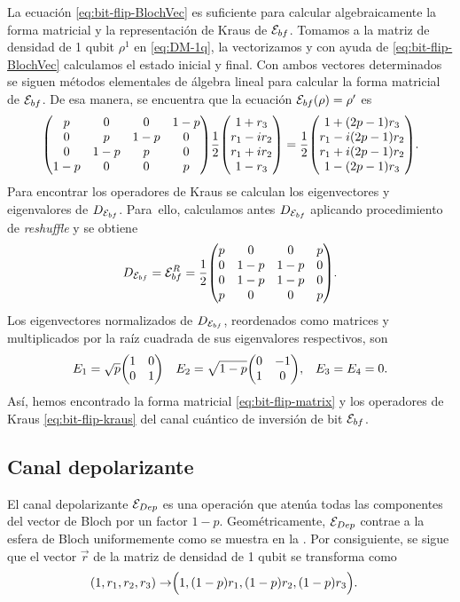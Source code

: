La ecuación \eqref{eq:bit-flip-BlochVec} es suficiente para 
calcular algebraicamente la forma matricial y 
la representación de Kraus de $\mathcal{E}_{bf}$.
Tomamos a la matriz de densidad de 1 qubit $\rho^1$ en 
\eqref{eq:DM-1q}, la vectorizamos y con ayuda de 
\eqref{eq:bit-flip-BlochVec} calculamos el estado inicial y 
final. Con ambos vectores determinados se siguen métodos elementales 
de álgebra lineal para calcular la forma matricial de $\mathcal{E}_{bf}$.
De esa manera, se encuentra que la ecuación 
$\mathcal{E}_{bf}(\rho)=\rho'$ es
\begin{align}
\mqty(
 p & 0 & 0 & 1-p \\
 0 & p & 1-p & 0 \\
 0 & 1-p & p & 0 \\
 1-p & 0 & 0 & p 
)
\frac{1}{2}
\mqty(
1+r_3\\r_1-ir_2\\r_1+ir_2\\1-r_3
)
=
\frac{1}{2}
\mqty(
1+\qty(2p-1)r_3\\
r_1-i\qty(2p-1)r_2\\
r_1+i\qty(2p-1)r_2\\
1-\qty(2p-1)r_3
).
\label{eq:bit-flip-matrix}
\end{align}
Para encontrar los operadores de Kraus se calculan los eigenvectores
y eigenvalores de $D_{\mathcal{E}_{bf}}$. Para~ello, calculamos antes
$D_{\mathcal{E}_{bf}}$ aplicando procedimiento de \textit{reshuffle} y se obtiene
\begin{align}
  D_{\E_{bf}}=\E_{bf}^R=
  \frac{1}{2}\mqty(
 p & 0 & 0 & p \\
 0 & 1-p & 1-p & 0 \\
 0 & 1-p & 1-p & 0 \\
 p & 0 & 0 & p 
  ).
  \label{eq:Choi-E_bpf}
\end{align}
Los eigenvectores normalizados de $D_{\mathcal{E}_{bf}}$, 
reordenados como matrices y multiplicados por 
la raíz cuadrada de sus eigenvalores respectivos, son
\begin{align}
E_1&=
\sqrt{p}
\mqty(
1 & 0\\
0 & 1
)&
E_2&=
\sqrt{1-p}
\mqty(
0 & -1\\
1 & 0
),
&E_3=E_4=0.
\label{eq:bit-flip-kraus}
\end{align}
Así, hemos encontrado la forma matricial \eqref{eq:bit-flip-matrix}
y los operadores de Kraus \eqref{eq:bit-flip-kraus} del canal
cuántico de inversión de bit $\mathcal{E}_{bf}$. 

\subsection{Canal depolarizante} %
El canal depolarizante $\mathcal{E}_{Dep}$ es una operación que
atenúa todas las componentes del vector de Bloch por un factor 
$1-p$.
Geométricamente, $\mathcal{E}_{Dep}$ contrae
a la esfera de Bloch uniformemente como se muestra en 
la . Por consiguiente, 
se sigue que el vector $\vec{r}$ de la matriz 
de densidad de 1 qubit se transforma como \cite{nielsen_chuang_2011}
\begin{align}
\qty(1,r_1,r_2,r_3)\rightarrow&\Big(1,\qty(1-p)r_1,\qty(1-p)r_2,\qty(1-p)r_3\Big).
\label{eq:depolarizing-bloch-vec}
\end{align}

